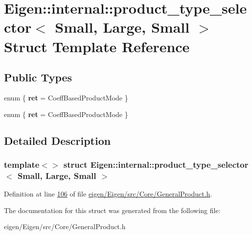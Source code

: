 \hypertarget{struct_eigen_1_1internal_1_1product__type__selector_3_01_small_00_01_large_00_01_small_01_4}{}\section{Eigen\+:\+:internal\+:\+:product\+\_\+type\+\_\+selector$<$ Small, Large, Small $>$ Struct Template Reference}
\label{struct_eigen_1_1internal_1_1product__type__selector_3_01_small_00_01_large_00_01_small_01_4}
\subsection*{Public Types}
\begin{DoxyCompactItemize}
\item 
\mbox{\label{struct_eigen_1_1internal_1_1product__type__selector_3_01_small_00_01_large_00_01_small_01_4_a6841b1f3ab19b5e08fb7b46f5730a7e4}} 
enum \{ {\bfseries ret} = Coeff\+Based\+Product\+Mode
 \}
\item 
\mbox{\label{struct_eigen_1_1internal_1_1product__type__selector_3_01_small_00_01_large_00_01_small_01_4_a66ee5bdf3e180d2a1d5c04ab6c94dba8}} 
enum \{ {\bfseries ret} = Coeff\+Based\+Product\+Mode
 \}
\end{DoxyCompactItemize}


\subsection{Detailed Description}
\subsubsection*{template$<$$>$\newline
struct Eigen\+::internal\+::product\+\_\+type\+\_\+selector$<$ Small, Large, Small $>$}



Definition at line \hyperlink{eigen_2_eigen_2src_2_core_2_general_product_8h_source_l00106}{106} of file \hyperlink{eigen_2_eigen_2src_2_core_2_general_product_8h_source}{eigen/\+Eigen/src/\+Core/\+General\+Product.\+h}.



The documentation for this struct was generated from the following file\+:\begin{DoxyCompactItemize}
\item 
eigen/\+Eigen/src/\+Core/\+General\+Product.\+h\end{DoxyCompactItemize}
